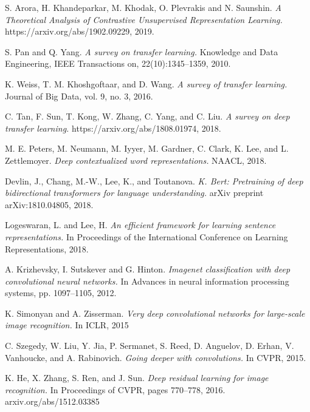 \documentclass[12pt]{article}
\begin{document}
\pagebreak
\medskip
\begin{thebibliography}{9}
{} 

S. Arora, H. Khandeparkar, M. Khodak, O. Plevrakis and N. Saunshin.
\textit{ A Theoretical Analysis of Contrastive Unsupervised Representation Learning.} https://arxiv.org/abs/1902.09229, 2019.

S. Pan and Q. Yang.
\textit{A survey on transfer learning.}  Knowledge and Data Engineering, IEEE Transactions on,
22(10):1345–1359, 2010.

K. Weiss, T. M. Khoshgoftaar, and D. Wang. \textit{ A survey of transfer learning.} 
Journal of Big Data, vol. 9, no. 3, 2016.

C. Tan, F. Sun, T. Kong, W. Zhang, C. Yang, and C. Liu.
\textit{A survey on deep transfer learning.}  https://arxiv.org/abs/1808.01974, 2018.

M. E. Peters, M. Neumann, M. Iyyer, M. Gardner, C. Clark, K. Lee, and L. Zettlemoyer. \textit{Deep contextualized word representations.} NAACL, 2018.

Devlin, J., Chang, M.-W., Lee, K., and Toutanova. \textit{K. Bert: Pretraining of deep bidirectional transformers for language understanding.} arXiv preprint arXiv:1810.04805, 2018.


Logeswaran, L. and Lee, H. \textit{An efficient framework for
learning sentence representations.}  In Proceedings of the
International Conference on Learning Representations,
2018.

A. Krizhevsky, I. Sutskever and G. Hinton.\textit{ Imagenet classification with deep convolutional
neural networks.} In Advances in neural information processing systems, pp. 1097–1105, 2012.

K. Simonyan and A. Zisserman. \textit{ Very deep convolutional networks
for large-scale image recognition.} In ICLR, 2015


C. Szegedy, W. Liu, Y. Jia, P. Sermanet, S. Reed, D. Anguelov, D. Erhan, V. Vanhoucke, and A. Rabinovich. \textit{Going deeper with convolutions.} In CVPR, 2015.

K. He, X. Zhang, S. Ren, and J. Sun. \textit{Deep
residual learning for image recognition.} In
Proceedings of CVPR, pages 770–778, 2016.
arxiv.org/abs/1512.03385


\end{thebibliography}
\end{document}
